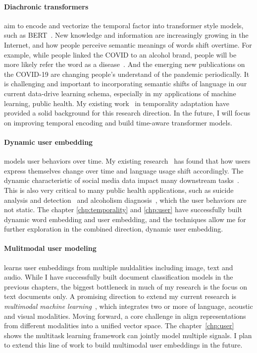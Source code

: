 \paragraph{Diachronic transformers}
aim to encode and vectorize the temporal factor into transformer style models, such as BERT~\cite{devlin2019bert}.
New knowledge and information are increasingly growing in the Internet, and how people perceive semantic meanings of words shift overtime. 
For example, while people linked the COVID to an alcohol brand, people will be more likely refer the word as a disease~\cite{broniatowski2020covid}. 
And the emerging new publications on the COVID-19 are changing people's understand of the pandemic periodically.
It is challenging and important to incorporating semantic shifts of language in our current data-drive learning schema, especially in my applications of machine learning, public health. 
My existing work~\cite{huang2018examining, huang2018modeling, huang2019neural} in temporality adaptation have provided a solid background for this research direction.
In the future, I will focus on improving temporal encoding and build time-aware transformer models.


\paragraph{Dynamic user embedding}
models user behaviors over time. 
My existing research~\cite{huang2019neural} has found that how users express themselves change over time and language usage shift accordingly. 
The dynamic characteristic of social media data impact many downstream tasks~\cite{pan2019social}. 
This is also very critical to many public health applications, such as suicide analysis and detection~\cite{huang2015topic, huang2017exploring} and alcoholism diagnosis~\cite{huang2018modeling}, which the user behaviors are not static.
The chapter \ref{chp:temporality} and \ref{chp:user} have successfully built dynamic word embedding and user embedding, and the techniques allow me for further exploration in the combined direction, dynamic user embedding.


\paragraph{Mulitmodal user modeling}
learns user embeddings from multiple muldalities including image, text and audio. 
While I have successfully built document classification models in the previous chapters, the biggest bottleneck in much of my research is the focus on text documents only.
A promising direction to extend my current research is \textit{multimodal machine learning}~\cite{baltrusaitis2019multimodal}, which integrates two or more of language, acoustic and visual modalities.
Moving forward, a core challenge in align representations from different modalities into a unified vector space. 
The chapter~\ref{chp:user} shows the multitask learning framework can jointly model multiple signals. 
I plan to extend this line of work to build multimodal user embeddings in the future.
